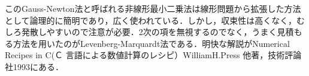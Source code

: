 このGauss-Newton法と呼ばれる非線形最小二乗法は線形問題から拡張した方法として論理的に簡明であり，広く使われている．しかし，収束性は高くなく，むしろ発散しやすいので注意が必要．2次の項を無視するのでなく，うまく見積もる方法を用いたのがLevenberg-Marquardt法である．明快な解説がNumerical Recipes in C(Ｃ 言語による数値計算のレシピ）WilliamH.Press 他著，技術評論社1993にある．
